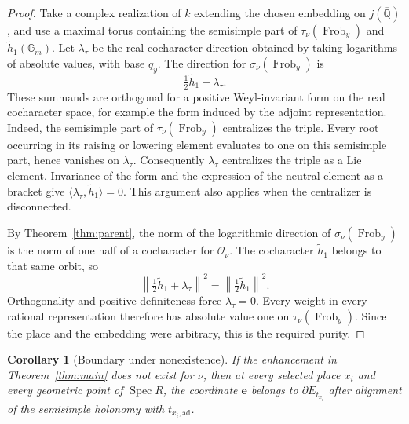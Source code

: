 \documentclass[11pt]{article}
\numberwithin{equation}{section}
\newtheorem{corollary}[theorem]{Corollary}
\theoremstyle{definition}
\theoremstyle{remark}
\newcommand{\Q}{\mathbb Q}
\newcommand{\Frob}{\operatorname{Frob}}
\newcommand{\Spec}{\operatorname{Spec}}
\begin{document}
\begin{proof}
Take a complex realization of $k$ extending the chosen embedding
on $j(\overline{\Q})$, and use a maximal torus containing the
semisimple part of $\tau_\nu(\Frob_y)$ and
$\widetilde h_1(\mathbb G_m)$.  Let $\lambda_\tau$ be the
real cocharacter direction obtained by taking logarithms of
absolute values, with base $q_y$.  The direction for
$\sigma_\nu(\Frob_y)$ is
\[
                         \tfrac12\widetilde h_1+\lambda_\tau.
\]
These summands are orthogonal for a positive Weyl-invariant form
on the real cocharacter space, for example the form induced by
the adjoint representation.  Indeed, the semisimple part of
$\tau_\nu(\Frob_y)$ centralizes the triple.  Every root occurring
in its raising or lowering element evaluates to one on this
semisimple part, hence vanishes on $\lambda_\tau$.
Consequently $\lambda_\tau$ centralizes the triple as a Lie
element.  Invariance of the form and the expression of the neutral
element as a bracket give
$\langle\lambda_\tau,\widetilde h_1\rangle=0$.
This argument also applies when the centralizer is disconnected.

By Theorem~\ref{thm:parent}, the norm of the logarithmic direction
of $\sigma_\nu(\Frob_y)$ is the norm of one half of a
cocharacter for $\mathcal O_\nu$.  The cocharacter
$\widetilde h_1$ belongs to that same orbit, so
\[
 \left\|\tfrac12\widetilde h_1+\lambda_\tau\right\|^2
       =\left\|\tfrac12\widetilde h_1\right\|^2.
\]
Orthogonality and positive definiteness force $\lambda_\tau=0$.
Every weight in every rational representation therefore has
absolute value one on $\tau_\nu(\Frob_y)$.  Since the place and
the embedding were arbitrary, this is the required purity.
\end{proof}

\begin{corollary}[Boundary under nonexistence]\label{cor:orbit-boundary}
If the enhancement in Theorem~\ref{thm:main} does not exist for
$\nu$, then at every selected place $x_i$ and every geometric
point of $\Spec R$, the coordinate $\mathbf e$ belongs to
$\partial E_{t_{x_i}}$ after alignment of the semisimple holonomy
with $t_{x_i,\mathrm{ad}}$.
\end{corollary}
\end{document}
